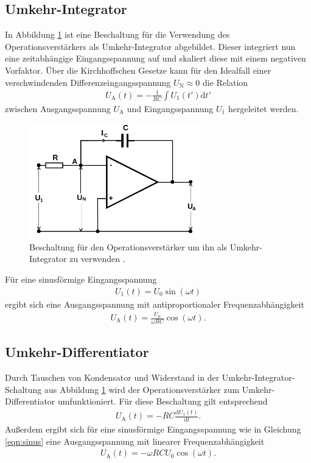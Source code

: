 \subsection{Umkehr-Integrator}

In Abbildung \ref{fig:integrator} ist eine Beschaltung für die Verwendung des Operationsverstärkers
als Umkehr-Integrator abgebildet. Dieser integriert nun eine zeitabhängige Eingangsspannung auf
und skaliert diese mit einem negativen Vorfaktor.
Über die Kirchhoffschen Gesetze kann für den Idealfall einer verschwindenden Differenzeingangsspannung
$U_\text{N} \approx 0$ die Relation
\begin{align}
  U_\text{A}(t) = - \frac1{R C} \int U_1(t') \mathrm{d}t'
\end{align}
zwischen Ausgangsspannung $U_\text{A}$ und Eingangsspannung $U_1$ hergeleitet werden.

\begin{figure}
  \centering
  \includegraphics[height=5cm]{ImmerDieseNorweger/integrator.png}
  \caption{Beschaltung für den Operationsverstärker um ihn als Umkehr-Integrator zu verwenden \cite{anleitung}.}
  \label{fig:integrator}
\end{figure}

Für eine sinusförmige Eingangsspannung
\begin{align}
  U_1(t) = U_0 \sin \left( \omega t \right)
  \label{eqn:sinus}
\end{align}
ergibt sich eine Ausgangsspannung mit antiproportionaler Frequenzabhängigkeit
\begin{align}
  U_\text{A}(t) = \frac{U_0}{\omega R C} \cos \left( \omega t \right).
  \label{eqn:int_aus}
\end{align}

\subsection{Umkehr-Differentiator}

Durch Tauschen von Kondensator und Widerstand in der Umkehr-Integrator-Schaltung aus Abbildung \ref{fig:integrator}
wird der Operationsverstärker zum Umkehr-Differentiator umfunktioniert.
Für diese Beschaltung gilt entsprechend
\begin{align}
  U_\text{A}(t) = - RC \frac{\mathrm{d} U_1(t)}{\mathrm{d}t}.
\end{align}
Außerdem ergibt sich für eine sinusförmige Eingangsspannung wie in Gleichung \eqref{eqn:sinus}
eine Ausgangsspannung mit linearer Frequenzabhängigkeit
\begin{align}
  U_\text{A}(t) = - \omega R C U_0 \cos \left( \omega t \right).
  \label{eqn:diff_aus}
\end{align}

